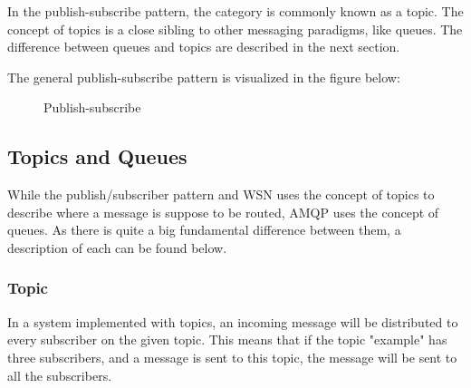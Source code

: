 In the publish-subscribe pattern, the category is commonly known as a topic. The concept of topics is a close sibling to other messaging paradigms, like queues. The difference between queues and topics are described in the next section. 

The general publish-subscribe pattern is visualized in the figure \cite{pub-sub-image} below:

\begin{center}
  \begin{figure}[ht]
    \caption{Publish-subscribe}
    \label{fig:publish-subscribe}
  \end{figure}
\end{center}

\subsection{Topics and Queues}
\label{subsec:architecture_and_implementation-topic_and_queue_differecnce}
While the publish/subscriber pattern and WSN uses the concept of topics to describe where a message is suppose to be routed, AMQP uses the concept of queues. As there is quite a big fundamental difference between them, a description of each can be found below. 

\subsubsection{Topic}
In a system implemented with topics, an incoming message will be distributed to every subscriber on the given topic. This means that if the topic "example" has three subscribers, and a message is sent to this topic, the message will be sent to all the subscribers.

